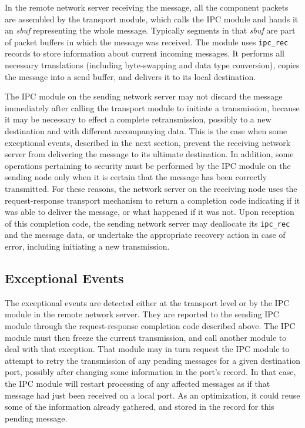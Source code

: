 In the remote network server receiving the message, all the component
packets are assembled by the transport module, which calls the IPC
module and hands it an {\it sbuf} representing the whole message.
Typically segments in that {\it sbuf} are part of packet buffers in
which the message was received.  The module uses \verb"ipc_rec"
records to store information about current incoming messages.  It
performs all necessary translations (including byte-swapping and data
type conversion), copies the message into a send buffer, and delivers
it to its local destination.

The IPC module on the sending network server may not discard the
message immediately after calling the transport module to initiate a
transmission, because it may be necessary to effect a complete
retransmission, possibly to a new destination and with different
accompanying data. This is the case when some exceptional events,
described in the next section, prevent the receiving network server
from delivering the message to its ultimate destination.  In addition,
some operations pertaining to security must be performed by the IPC
module on the sending node only when it is certain that the message
has been correctly transmitted. For these reasons, the network server
on the receiving node uses the request-response transport mechanism to
return a completion code indicating if it was able to deliver the
message, or what happened if it was not. Upon reception of this
completion code, the sending network server may deallocate its
\verb"ipc_rec" and the message data, or undertake the appropriate
recovery action in case of error, including initiating a new
transmission.

\subsection{Exceptional Events}
The exceptional events are detected either at the transport level or
by the IPC module in the remote network server.  They are reported to
the sending IPC module through the request-response completion code
described above.  The IPC module must then freeze the current
transmission, and call another module to deal with that exception.
That module may in turn request the IPC module to attempt to retry the
transmission of any pending messages for a given destination port,
possibly after changing some information in the port's record.  In
that case, the IPC module will restart processing of any affected
messages as if that message had just been received on a local port.
As an optimization, it could reuse some of the information already
gathered, and stored in the record for this pending message.

